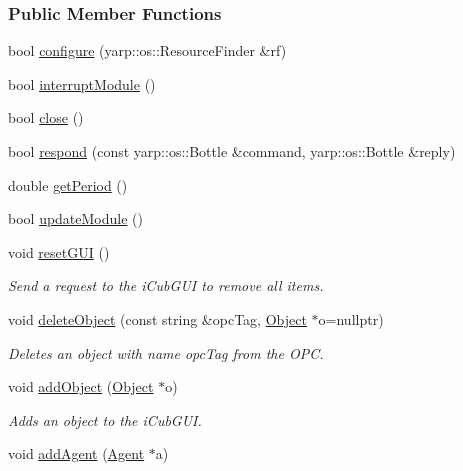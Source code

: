 \subsubsection*{Public Member Functions}
\begin{DoxyCompactItemize}
\item 
bool \hyperlink{group__guiUpdater_a485439498bb6de83e9d222659e019e4c}{configure} (yarp\+::os\+::\+Resource\+Finder \&rf)
\item 
bool \hyperlink{group__guiUpdater_af6803c377f58e93185c0994af795cd32}{interrupt\+Module} ()
\item 
bool \hyperlink{group__guiUpdater_a337583d3d57d7b3e6aa14e3ef3f21e75}{close} ()
\item 
bool \hyperlink{group__guiUpdater_a65c3df8e11e7439a0c8d01fec93b10c1}{respond} (const yarp\+::os\+::\+Bottle \&command, yarp\+::os\+::\+Bottle \&reply)
\item 
double \hyperlink{group__guiUpdater_a4d8e42af983197a7b97c80ca6e52fc49}{get\+Period} ()
\item 
bool \hyperlink{group__guiUpdater_a344c4d08c3da25c91699b1b41575b5f9}{update\+Module} ()
\item 
void \hyperlink{group__guiUpdater_aae5c54332b87a2981d6e5a1f704b9459}{reset\+G\+UI} ()
\begin{DoxyCompactList}\small\item\em Send a request to the i\+Cub\+G\+UI to remove all items. \end{DoxyCompactList}\item 
void \hyperlink{group__guiUpdater_ac7d1b20d82741e487af43594dd20d498}{delete\+Object} (const string \&opc\+Tag, \hyperlink{group__icubclient__representations_classicubclient_1_1Object}{Object} $\ast$o=nullptr)
\begin{DoxyCompactList}\small\item\em Deletes an object with name {\ttfamily opc\+Tag} from the O\+PC. \end{DoxyCompactList}\item 
void \hyperlink{group__guiUpdater_afa069ae03069ad5862a3beba9ef8c2fc}{add\+Object} (\hyperlink{group__icubclient__representations_classicubclient_1_1Object}{Object} $\ast$o)
\begin{DoxyCompactList}\small\item\em Adds an object to the i\+Cub\+G\+UI. \end{DoxyCompactList}\item 
void \hyperlink{group__guiUpdater_a1f2afbe4efaec509ee1687f35e7c0eef}{add\+Agent} (\hyperlink{group__icubclient__representations_classicubclient_1_1Agent}{Agent} $\ast$a)

\end{DoxyCompactItemize}
